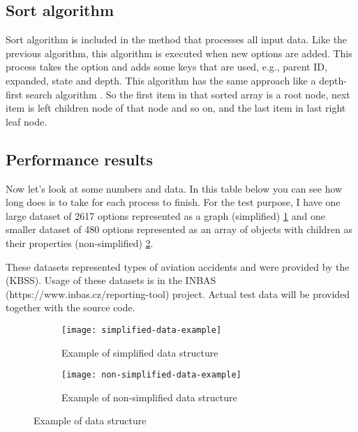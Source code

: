 \subsection{Sort algorithm}

Sort algorithm is included in the method that processes all input data. Like the previous algorithm, this algorithm is executed when new options are added. This process takes the option and adds some keys that are used, e.g., parent ID, expanded, state and depth. This algorithm has the same approach like a depth-first search algorithm \parencite{dfs}. So the first item in that sorted array is a root node, next item is left children node of that node and so on, and the last item in last right leaf node.


\subsection{Performance results}

Now let's look at some numbers and data. In this table below you can see how long does is to take for each process to finish. 
For the test purpose, I have one large dataset of 2617 options represented as a graph (simplified) \ref{fig:simplified-data-example} and one smaller dataset of 480 options represented as an array of objects with children as their properties (non-simplified) \ref{fig:non-simplified-data-example}. 

These datasets represented types of aviation accidents and were provided by the \groupname (KBSS). Usage of these datasets is in the INBAS (https://www.inbas.cz/reporting-tool) project. Actual test data will be provided together with the source code.

\begin{figure}
  \centering
  \begin{subfigure}{.5\textwidth}
    \centering
    \texttt{[image: simplified-data-example]}
    \caption[Simplified dataset]{Example of simplified data structure}
    \label{fig:simplified-data-example}
  \end{subfigure}%
  \begin{subfigure}{.5\textwidth}
    \centering
    \texttt{[image: non-simplified-data-example]}
     \caption[Non-Simplified dataset]{Example of non-simplified data structure}
    \label{fig:non-simplified-data-example}
  \end{subfigure}
  \caption[Input data example]{Example of data structure}
  \label{fig:input-data-example}
\end{figure}



